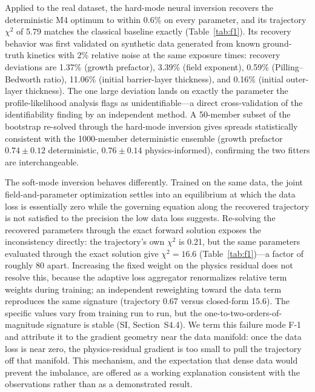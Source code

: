 \documentclass[preprint,12pt]{elsarticle}
\begin{document}
Applied to the real dataset, the hard-mode neural inversion recovers the
deterministic M4 optimum to within 0.6\% on every parameter, and its
trajectory $\chi^2$ of 5.79 matches the classical baseline exactly
(Table~\ref{tab:f1}). Its recovery behavior was first validated on
synthetic data generated from known ground-truth kinetics with 2\%
relative noise at the same exposure times: recovery deviations are
1.37\% (growth prefactor), 3.39\% (field exponent), 0.59\%
(Pilling--Bedworth ratio), 11.06\% (initial barrier-layer thickness),
and 0.16\% (initial outer-layer thickness). The one large deviation
lands on exactly the parameter the profile-likelihood analysis flags as
unidentifiable---a direct cross-validation of the identifiability
finding by an independent method. A 50-member subset of the bootstrap
re-solved through the hard-mode inversion gives spreads statistically
consistent with the 1000-member deterministic ensemble (growth
prefactor $0.74 \pm 0.12$ deterministic, $0.76 \pm 0.14$
physics-informed), confirming the two fitters are interchangeable.

The soft-mode inversion behaves differently. Trained on the same data,
the joint field-and-parameter optimization settles into an equilibrium
at which the data loss is essentially zero while the governing equation
along the recovered trajectory is not satisfied to the precision the
low data loss suggests. Re-solving the recovered parameters through the
exact forward solution exposes the inconsistency directly: the
trajectory's own $\chi^2$ is 0.21, but the same parameters evaluated
through the exact solution give $\chi^2 = 16.6$
(Table~\ref{tab:f1})---a factor of roughly 80 apart.
Increasing the fixed weight on the physics residual does not resolve
this, because the adaptive loss aggregator renormalizes relative term
weights during training; an independent reweighting toward the data
term reproduces the same signature (trajectory 0.67 versus closed-form
15.6). The specific values vary from training run to run, but the
one-to-two-orders-of-magnitude signature is stable (SI, Section~S4.4). We term
this failure mode F-1 and attribute it to the gradient geometry near
the data manifold: once the data loss is near zero, the physics-residual
gradient is too small to pull the trajectory off that manifold. This
mechanism, and the expectation that dense data would prevent the
imbalance, are offered as a working explanation consistent with the
observations rather than as a demonstrated result.
\end{document}
